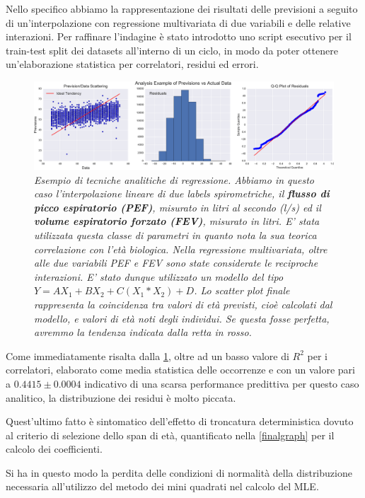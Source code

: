\documentclass[12pt,openright,twoside,a4paper]{book}
\begin{document}
Nello specifico abbiamo la rappresentazione dei risultati delle previsioni a seguito di un'interpolazione con regressione multivariata di due variabili e delle relative interazioni.
Per raffinare l'indagine è stato introdotto uno script esecutivo per il train-test split dei datasets all'interno di un ciclo, in modo da poter ottenere un'elaborazione statistica per correlatori, residui ed errori.

\begin{figure}[!h]
\centering
\includegraphics[width=1.2\linewidth]{mulregression}
\caption{\textit{Esempio di tecniche analitiche di regressione. Abbiamo in questo caso l'interpolazione lineare di due labels spirometriche, il \textbf{flusso di picco espiratorio (PEF)}, misurato in litri al secondo (l/s) ed il \textbf{volume espiratorio forzato (FEV)}, misurato in litri. E' stata utilizzata questa classe di parametri in quanto nota la sua teorica correlazione con l'età biologica. Nella regressione multivariata, oltre alle due variabili PEF e FEV sono state considerate le reciproche interazioni. E' stato dunque utilizzato  un modello del tipo $Y=AX_1+BX_2+C(X_1*X_2)+D$. Lo scatter plot finale rappresenta la coincidenza tra valori di età previsti, cioè calcolati dal modello, e valori di età noti degli individui. Se questa fosse perfetta, avremmo la tendenza indicata dalla retta in rosso.}}
\label{mulregression}
\end{figure}

Come immediatamente risalta dalla \ref{mulregression}, oltre ad un basso valore di $R^2$ per i correlatori, elaborato come media statistica delle occorrenze e con un valore pari a $0.4415\pm0.0004$ indicativo di una scarsa performance predittiva per questo caso analitico, la distribuzione dei residui è molto piccata.

Quest'ultimo fatto è sintomatico dell'effetto di troncatura deterministica dovuto al criterio di selezione dello span di età, quantificato nella \ref{finalgraph} per il calcolo dei coefficienti.

Si ha in questo modo la perdita delle condizioni di normalità della distribuzione necessaria all'utilizzo del metodo dei mini quadrati nel calcolo del MLE.
\end{document}
